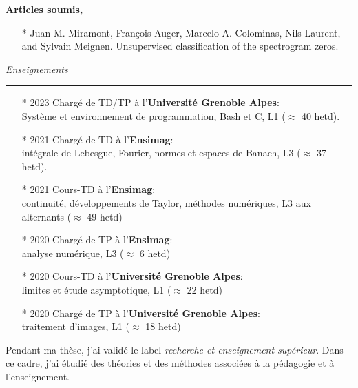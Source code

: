 \documentclass[a4paper,10pt, french]{article}
\begin{document}

\textbf{Articles soumis,}
\begin{itemize}
  \setlength\itemsep{3mm}
  \item[*] Juan M. Miramont, François Auger, Marcelo A. Colominas, Nils Laurent, and Sylvain Meignen. Unsupervised classification of the spectrogram zeros.
\end{itemize}
\vspace{5mm}
\newpage

\noindent
\textit{\Large \color{MyGray} \hspace{5mm} Enseignements}
\vspace{2mm}
{\color{DefaultGray}\hrule height .1pt}
\vspace{4mm}

\begin{itemize}
	\setlength\itemsep{3mm}
	\item[*] 2023 Chargé de TD/TP à l'\textbf{Université Grenoble Alpes}:\\
	Système et environnement de programmation, Bash et C, L1 ($\approx$ 40 hetd).
	\item[*] 2021 Chargé de TD à l'\textbf{Ensimag}:\\
	intégrale de Lebesgue, Fourier, normes et espaces de Banach, L3 ($\approx$ 37 hetd).
	\item[*] 2021 Cours-TD à l'\textbf{Ensimag}:\\
	continuité, développements de Taylor, méthodes numériques, L3 aux alternants ($\approx$ 49 hetd)
	\item[*] 2020 Chargé de TP à l'\textbf{Ensimag}:\\ analyse numérique, L3 ($\approx$ 6 hetd)
	\item[*] 2020 Cours-TD à l'\textbf{Université Grenoble Alpes}:\\
	limites et étude asymptotique, L1 ($\approx$ 22 hetd)
	\item[*] 2020 Chargé de TP à l'\textbf{Université Grenoble Alpes}:\\
	traitement d'images, L1 ($\approx$ 18 hetd)
\end{itemize}

\vspace{3mm}
Pendant ma thèse, j'ai validé le label \emph{recherche et enseignement supérieur}. Dans ce cadre, j'ai étudié des théories et des méthodes associées à la pédagogie et à l'enseignement.
\end{document}
